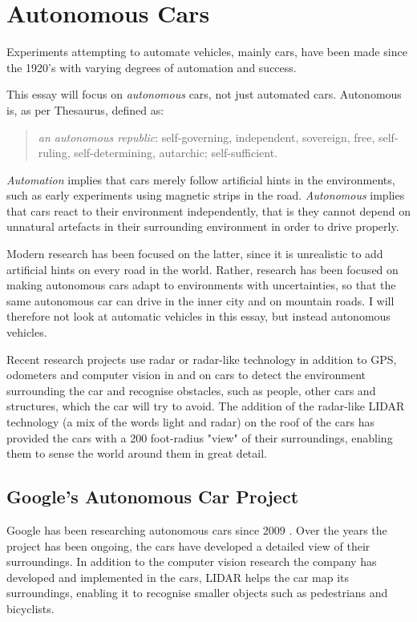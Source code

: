 \chapter{Autonomous Cars}

Experiments attempting to automate vehicles, mainly cars, have been made since the 1920's with varying degrees of automation and success. 

This essay will focus on \textit{autonomous} cars, not just automated cars. Autonomous is, as per Thesaurus, defined as: 


\bigskip \blockquote{\textit{an autonomous republic}: self-governing, independent, sovereign, free, self-ruling, self-determining, autarchic; self-sufficient.}

\newpar \textit{Automation} implies that cars merely follow artificial hints in the environments, such as early experiments using magnetic strips in the road. 
\textit{Autonomous} implies that cars react to their environment independently, that is they cannot depend on unnatural artefacts in their surrounding environment in order to drive properly. 

Modern research has been focused on the latter, since it is unrealistic to add artificial hints on every road in the world. Rather, research has been focused on making autonomous cars adapt to environments with uncertainties, so that the same autonomous car can drive in the inner city and on mountain roads. I will therefore not look at automatic vehicles in this essay, but instead autonomous vehicles. 

Recent research projects use radar or radar-like technology in addition to GPS, odometers and computer vision in and on cars to detect the environment surrounding the car and recognise obstacles, such as people, other cars and structures, which the car will try to avoid. The addition of the radar-like LIDAR technology (a mix of the words light and radar) on the roof of the cars has provided the cars with a 200 foot-radius "view" of their surroundings, enabling them to sense the world around them in great detail. 

\section{Google's Autonomous Car Project}
Google has been researching autonomous cars since 2009 \cite{googlecars}. Over the years the project has been ongoing, the cars have developed a detailed view of their surroundings. In addition to the computer vision research the company has developed and implemented in the cars, LIDAR helps the car map its surroundings, enabling it to recognise smaller objects such as pedestrians and bicyclists. 

